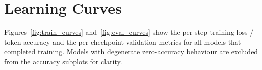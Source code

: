 \documentclass[11pt,a4paper]{article}
\begin{document}
\begin{table}[h]
  \centering
  \caption{Training run summary (best eval metrics across all checkpoints)}
  \label{tab:results}
\end{table}


\section{Learning Curves}

Figures~\ref{fig:train_curves} and~\ref{fig:eval_curves} show the per-step
training loss / token accuracy and the per-checkpoint validation metrics for
all models that completed training. Models with degenerate zero-accuracy
behaviour are excluded from the accuracy subplots for clarity.
\end{document}

